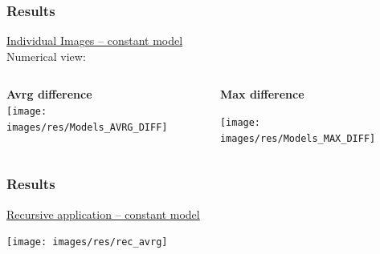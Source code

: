 \documentclass[18pt]{beamer}
\begin{document}
\begin{frame}[t]
  \frametitle{Results}
  \vspace{-1cm}
  \begin{center}
    {\large \underline{Individual Images -- constant model}} \\
    Numerical view:
  \end{center}
  \vspace{-0.8cm}
  \begin{columns}[t]
    \begin{column}{0.5\textwidth}
      \begin{center}
        \textbf{Avrg difference} \\
        \texttt{[image: images/res/Models\_AVRG\_DIFF]}
      \end{center}
    \end{column}
    \begin{column}{0.5\textwidth}
        \textbf{Max difference} \\
      \begin{center}
        \texttt{[image: images/res/Models\_MAX\_DIFF]}
      \end{center}
    \end{column}
  \end{columns}
\end{frame}


\begin{frame}[t]
  \frametitle{Results}
  \vspace{-1cm}
  \begin{center}
    {\large \underline{Recursive application -- constant model}} \\
  \end{center}
  \begin{center}
    \texttt{[image: images/res/rec\_avrg]}
  \end{center}
\end{frame}
\end{document}
